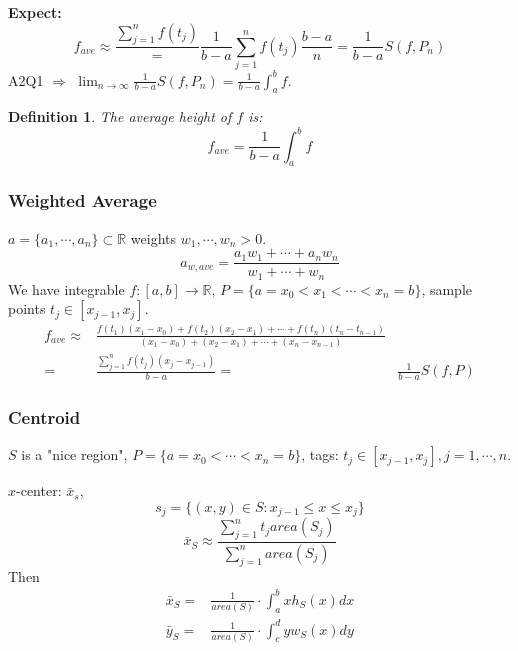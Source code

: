 \documentclass[12pt]{article}
\theoremstyle{plain}
\newtheorem{definition}{Definition}[subsection]
\newcommand{\mR}{{\mathbb{R}}}
\begin{document}
\textbf{Expect: }
\[
	f_{ave} \approx \frac{\sum_{j=1}^n f(t_j)} = \frac1{b-a}\sum_{j=1}^n 
	f(t_j) \frac{b-a}n = \frac1{b-a} S(f,P_n)
\]
A2Q1 $\Rightarrow$ $\lim_{n\to \infty} \frac1{b-a} S(f,P_n)
= \frac1{b-a}\int_a^b f$.\\

\begin{definition}
	The average height of $f$ is: 
	\[
		f_{ave} = \frac1{b-a} \int_a^b f
	\]
\end{definition}


\subsubsection{Weighted Average}
$a = \{a_1, \cdots, a_n\} \subset \mR$ weights $w_1, \cdots, w_n > 0$. 
\[
	a_{w, ave} = \frac{a_1w_1 + \cdots +a_nw_n}{w_1 + \cdots +w_n}
\]
We have integrable $f:[a,b] \to \mR$, $P=\{a = x_0 < x_1 < \cdots < x_n=b\}$,
sample points $t_j \in [x_{j-1}, x_j]$. 
\begin{align*}
	f_{ave} 
	\approx& \frac{f(t_1)(x_1-x_{0}) + f(t_2)(x_2-x_1) + 
	\cdots + f(t_n)(t_n-t_{n-1})}{(x_1-x_0)+(x_2-x_1)+\cdots+(x_n-x_{n-1})}\\
	=& \frac{\sum_{j=1}^n f(t_j) (x_j-x_{j-1})}{b-a} 
	=& \frac1{b-a} S(f,P)
\end{align*}

\subsubsection{Centroid}
$S$ is a "nice region", $P=\{a = x_0 < \cdots < x_n = b\}$, tags: 
$t_j \in [x_{j-1}, x_j], j = 1, \cdots, n$. 

$x$-center: $\bar x_s$, 
\[
	s_j = \{(x,y) \in S : x_{j-1} \leq x \leq x_j\}
\]
\[
	\bar x_S \approx \frac{\sum_{j=1}^n t_j area(S_j) }{\sum_{j=1}^n area(S_j)}
\]
Then 
\begin{align*}
	\bar x_S =& \frac 1{area(S)} \cdot \int_a^b xh_S(x) dx\\
	\bar y_S =& \frac 1{area(S)} \cdot \int_c^d yw_S(x) dy\\
\end{align*}
\newpage
\end{document}
